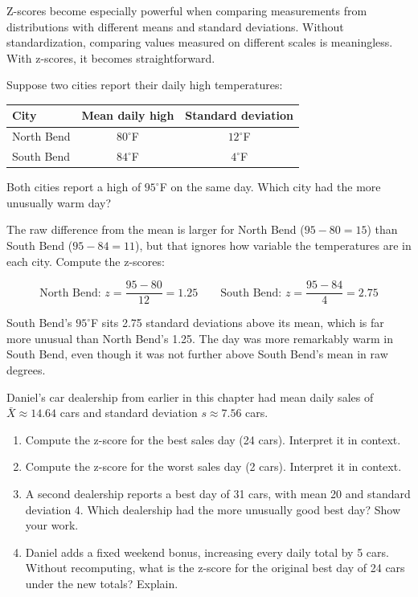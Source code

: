 Z-scores become especially powerful when comparing measurements from
distributions with different means and standard deviations. Without
standardization, comparing values measured on different scales is
meaningless. With z-scores, it becomes straightforward.

Suppose two cities report their daily high temperatures:

\begin{center}
\begin{tabular}{lcc}
City & Mean daily high & Standard deviation \\
\hline
North Bend & $80^{\circ}$F & $12^{\circ}$F \\
South Bend & $84^{\circ}$F & $4^{\circ}$F \\
\end{tabular}
\end{center}

Both cities report a high of $95^{\circ}$F on the same day. Which
city had the more unusually warm day?

The raw difference from the mean is larger for North Bend
($95 - 80 = 15$) than South Bend ($95 - 84 = 11$), but that ignores
how variable the temperatures are in each city. Compute the z-scores:

\[
\text{North Bend: } z = \frac{95 - 80}{12} = 1.25
\qquad
\text{South Bend: } z = \frac{95 - 84}{4} = 2.75
\]

South Bend's $95^{\circ}$F sits 2.75 standard deviations above its
mean, which is far more unusual than North Bend's 1.25. The day was more
remarkably warm in South Bend, even though it was not further above
South Bend's mean in raw degrees.

\begin{Exercise}[title={Computing and Interpreting Z-scores},
label={ex:zscores}]
Daniel's car dealership from earlier in this chapter had mean daily
sales of $\bar{X} \approx 14.64$ cars and standard deviation $s \approx
7.56$ cars.

\begin{enumerate}  
    \item Compute the z-score for the best sales day (24 cars).
    Interpret it in context.
    \item Compute the z-score for the worst sales day (2 cars).
    Interpret it in context.
    \item A second dealership reports a best day of 31 cars, with
    mean 20 and standard deviation 4. Which dealership had the more
    unusually good best day? Show your work.
    \item Daniel adds a fixed weekend
    bonus, increasing every daily total by 5 cars. Without
    recomputing, what is the z-score for the original best day
    of 24 cars under the new totals? Explain.
\end{enumerate}
\end{Exercise}

